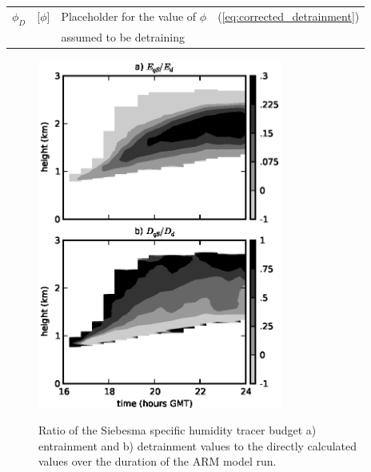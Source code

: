 \documentclass[12pt]{article}
\begin{document}
\begin{appendix}
\begin{table}[t]
\begin{center}
\begin{tabular}{lllr}
 $\phi_D$         
    & [$\phi$]            
    & Placeholder for the value of $\phi$ 
    & (\ref{eq:corrected_detrainment}) \\
   && assumed to be detraining & \\
\hline
\end{tabular}
\end{center}
\end{table}

\end{appendix}



{}
{\clearpage}




\begin{figure}[t]
  \noindent
  \includegraphics[width=19pc]{./figures/entrainment_ratio_variability}\\
  \caption{Ratio of the Siebesma specific humidity tracer budget a) entrainment
  and b) detrainment values to the directly calculated values over the duration
  of the ARM model run.}
  \label{fig:entrainment_ratio_variability}
\end{figure}
\end{document}
